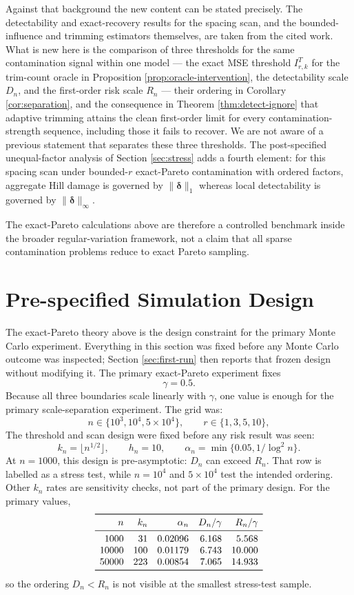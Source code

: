 \documentclass[11pt]{article}
\begin{document}
Against that background the new content can be stated precisely.  The
detectability and exact-recovery results for the spacing scan, and the
bounded-influence and trimming estimators themselves, are taken from the cited
work.  What is new here is the comparison of three thresholds for the same
contamination signal within one model --- the exact MSE threshold
$I^{T}_{r,k}$ for the trim-count oracle in Proposition
\ref{prop:oracle-intervention}, the detectability scale $D_n$, and the
first-order risk scale $R_n$ --- their ordering in Corollary
\ref{cor:separation}, and the consequence in Theorem
\ref{thm:detect-ignore} that adaptive trimming attains the clean first-order
limit for every contamination-strength sequence, including those it fails to
recover.  We are not aware of a previous statement that separates these three
thresholds.  The post-specified unequal-factor analysis of Section
\ref{sec:stress} adds a fourth element: for this spacing scan under bounded-$r$
exact-Pareto contamination with ordered factors, aggregate Hill damage is
governed by $\|\boldsymbol\delta\|_1$ whereas local detectability is governed
by $\|\boldsymbol\delta\|_\infty$.

The exact-Pareto calculations above are therefore a controlled benchmark inside
the broader regular-variation framework, not a claim that all sparse
contamination problems reduce to exact Pareto sampling.

\section{Pre-specified Simulation Design}
\label{sec:frozen-design}

The exact-Pareto theory above is the design constraint for the primary Monte
Carlo experiment.  Everything in this section was fixed before any Monte Carlo
outcome was inspected; Section \ref{sec:first-run} then reports that frozen
design without modifying it.  The primary exact-Pareto experiment fixes
\[
  \gamma=0.5.
\]
Because all three boundaries scale linearly with $\gamma$, one value is enough
for the primary scale-separation experiment.  The grid was:
\[
  n\in\{10^3,10^4,5\times10^4\},
  \qquad
  r\in\{1,3,5,10\},
\]
The threshold and scan design were fixed before any risk result was seen:
\[
  k_n=\lfloor n^{1/2}\rfloor,
  \qquad
  h_n=10,
  \qquad
  \alpha_n=\min\{0.05,1/\log^2 n\}.
\]
At $n=1000$, this design is pre-asymptotic: $D_n$ can exceed $R_n$.  That row
is labelled as a stress test, while $n=10^4$ and $5\times10^4$ test the
intended ordering.  Other $k_n$ rates are sensitivity checks, not part of the
primary design.
For the primary values,
\[
\begin{array}{rrrrr}
\toprule
n & k_n & \alpha_n & D_n/\gamma & R_n/\gamma\\
\midrule
1000 & 31  & 0.02096 & 6.168 & 5.568\\
10000 & 100 & 0.01179 & 6.743 & 10.000\\
50000 & 223 & 0.00854 & 7.065 & 14.933\\
\bottomrule
\end{array}
\]
so the ordering $D_n<R_n$ is not visible at the smallest stress-test sample.
\end{document}
